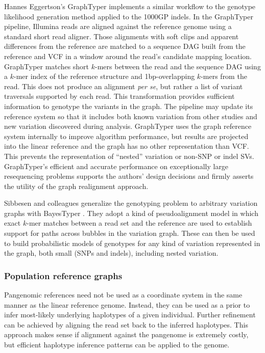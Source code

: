 \documentclass[a4paper,12pt,numbered,oneside]{Classes/PhDThesisPSnPDF}
\begin{document}
Hannes Eggertson's GraphTyper \cite{eggertsson2017graphtyper} implements a similar workflow to the genotype likelihood generation method applied to the 1000GP indels.
In the GraphTyper pipeline, Illumina reads are aligned against the reference genome using a standard short read aligner.
Those alignments with soft clips and apparent differences from the reference are matched to a sequence DAG built from the reference and VCF in a window around the read's candidate mapping location.
GraphTyper matches short $k$-mers between the read and the sequence DAG using a $k$-mer index of the reference structure and 1bp-overlapping $k$-mers from the read.
This does not produce an alignment \emph{per se}, but rather a list of variant traversals supported by each read.
This transformation provides sufficient information to genotype the variants in the graph.
The pipeline may update its reference system so that it includes both known variation from other studies and new variation discovered during analysis.
GraphTyper uses the graph reference system internally to improve algorithm performance, but results are projected into the linear reference and the graph has no other representation than VCF.
This prevents the representation of ``nested'' variation or non-SNP or indel SVs.
GraphTyper's efficient and accurate performance on exceptionally large resequencing problems supports the authors' design decisions and firmly asserts the utility of the graph realignment approach.

Sibbesen and colleagues generalize the genotyping problem to arbitrary variation graphs with BayesTyper \cite{sibbesen2018accurate}.
They adopt a kind of pseudoalignment model in which exact $k$-mer matches between a read set and the reference are used to establish support for paths across bubbles in the variation graph.
These can then be used to build probabilistic models of genotypes for any kind of variation represented in the graph, both small (SNPs and indels), including nested variation.

\subsubsection{Population reference graphs}

Pangenomic references need not be used as a coordinate system in the same manner as the linear reference genome.
Instead, they can be used as a prior to infer most-likely underlying haplotypes of a given individual.
Further refinement can be achieved by aligning the read set back to the inferred haplotypes.
This approach makes sense if alignment against the pangenome is extremely costly, but efficient haplotype inference patterns can be applied to the genome.
\end{document}
